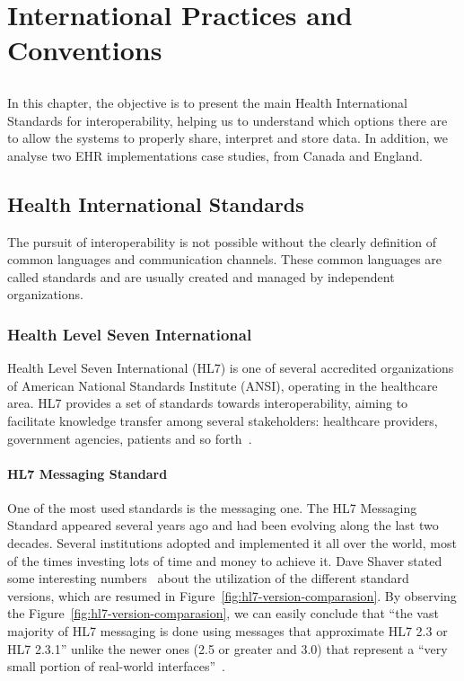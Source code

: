 
\chapter{International Practices and Conventions}\label{chap:standards}

\section*{}

In this chapter, the objective is to present the main Health International Standards for interoperability, helping us to understand which options there are to allow the systems to properly share, interpret and store data. In addition, we analyse two EHR implementations case studies, from Canada and England.


\section{Health International Standards}

The pursuit of interoperability is not possible without the clearly definition of common languages and communication channels. These common languages are called standards and are usually created and managed by independent organizations.

\subsection{Health Level Seven International}

Health Level Seven International (HL7) is one of several accredited organizations of American National Standards Institute (ANSI), operating in the healthcare area. HL7 provides a set of standards towards interoperability, aiming to facilitate knowledge transfer among several stakeholders: healthcare providers, government agencies, patients and so forth~\citep{Seven}.


\subsubsection{HL7 Messaging Standard}

One of the most used standards is the messaging one. The HL7 Messaging Standard appeared several years ago and had been evolving along the last two decades. Several institutions adopted and implemented it all over the world, most of the times investing lots of time and money to achieve it. Dave Shaver stated some interesting numbers~\citep{Shaver2010} about the utilization of the different standard versions, which are resumed in Figure~\ref{fig:hl7-version-comparasion}. By observing the Figure~\ref{fig:hl7-version-comparasion}, we can easily conclude that ``the vast majority of HL7 messaging is done using messages that approximate HL7 2.3 or HL7 2.3.1'' unlike the newer ones (2.5 or greater and 3.0) that represent a ``very small portion of real-world interfaces''~\citep{Shaver2010}.

